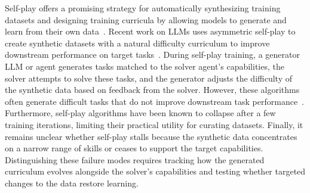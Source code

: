Self-play offers a promising strategy for automatically synthesizing training datasets and designing training curricula by allowing models to generate and learn from their own data~\citep{silver2017mastering,sukhbaatar2018intrinsic}.
Recent work on LLMs uses asymmetric self-play to create synthetic datasets with a natural difficulty curriculum to improve downstream performance on target tasks~\citep{zhao2025absolute,huang2026rzero,liu2026spade}.
During self-play training, a generator LLM or agent generates tasks matched to the solver agent's capabilities, the solver attempts to solve these tasks, and the generator adjusts the difficulty of the synthetic data based on feedback from the solver.
However, these algorithms often generate difficult tasks that do not improve downstream task performance~\citep{bailey2026scaling}.
Furthermore, self-play algorithms have been known to collapse after a few training iterations, limiting their practical utility for curating datasets.
Finally, it remains unclear whether self-play stalls because the synthetic data concentrates on a narrow range of skills or ceases to support the target capabilities. 
Distinguishing these failure modes requires tracking how the generated curriculum evolves alongside the solver’s capabilities and testing whether targeted changes to the data restore learning. 


